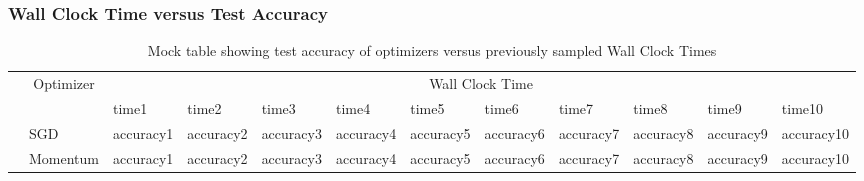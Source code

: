 \documentclass{article}
\begin{document}
\subsubsection{Wall Clock Time versus Test Accuracy}
\begin{table}[H]
	\begin{tabular}{l|l|l|l|l|l|l|l|l|l|l|l|}
		\cline{2-12}
		& \multicolumn{1}{c|}{\multirow{2}{*}{Optimizer}} & \multicolumn{10}{c|}{Wall Clock Time}                                                                                  \\ \cline{3-12} 
		& \multicolumn{1}{c|}{}                           & time1     & time2     & time3     & time4     & time5     & time6     & time7     & time8     & time9     & time10     \\ \cline{2-12} 
		& SGD                                             & accuracy1 & accuracy2 & accuracy3 & accuracy4 & accuracy5 & accuracy6 & accuracy7 & accuracy8 & accuracy9 & accuracy10 \\ \cline{2-12} 
		& Momentum                                        & accuracy1 & accuracy2 & accuracy3 & accuracy4 & accuracy5 & accuracy6 & accuracy7 & accuracy8 & accuracy9 & accuracy10 \\ \cline{2-12} 
	\end{tabular}
	\caption{Mock table showing test accuracy of optimizers versus previously sampled Wall Clock Times}
	\label{sec:WCTvsTA}
\end{table}
\end{document}
